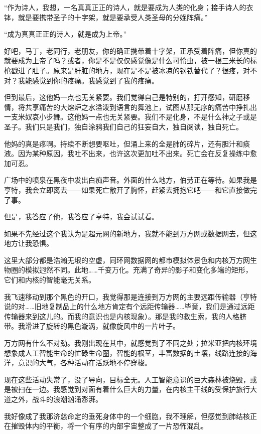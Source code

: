 \documentclass[AutoFakeBold=true]{book}
\begin{document}
``作为诗人，我想，一名真真正正的诗人，就是要成为人类的化身；接手诗人的衣钵，就是要携带圣子的十字架，就是要承受人类圣母的分娩阵痛。''

``成为真真正正的诗人，就是成为上帝。''

好吧，马丁，老同行，老朋友，你的确正携带着十字架，正承受着阵痛，但你真的就要成为上帝了吗？或者，你是不是仅仅感觉像是什么可怜虫，被一根三米长的标枪戳进了肚子。原来是肝脏的地方，现在是不是被冰凉的钢铁替代了？很疼，对不对？我能感觉到你的疼痛。我感觉到了我的疼痛。

但到最后，这他妈一点也无关紧要。我们觉得自己是特别的，打开感知，研磨移情，将共享痛苦的大熔炉之水溢泼到语言的舞池上，试图从那无序的痛苦中挣扎出一支米奴哀小步舞。这他妈一点也无关紧要。我们不是化身，不是什么神之子或是圣子。我们只是我们，独自涂鸦我们自己的狂妄自大，独自阅读，独自死亡。

他妈的真是疼啊。持续不断想要呕吐，但涌上来的全是肺的碎片，还有胆汁和痰液。因为某种原因，我吐不出来，也许这次更加吐不出来。死亡会在反复操练中愈加可忍。

广场中的喷泉在黑夜中发出白痴声音。外面的什么地方，伯劳正在等待。如果我是亨特，我会立即离去——如果死亡敞开了胸怀，赶紧去拥抱它吧——和它直接做完了事。

但是，我答应了他，我答应了亨特，我会试试看。

\vspace*{1em}

如果不先经过这个我认为是超元网的新地方，我就不能到万方网或数据网去，但这地方让我恐惧。

这里大部分都是浩瀚无垠的空虚，同环网数据网的都市模拟体景色和内核万方网生物圈的模拟迥然不同。此地……千变万化。充满了奇异的影子和变化多端的矩形，它们和内核的智能毫无关系。

我飞速移动到那个黑色的开口，我觉得那是连接到万方网的主要远距传输器（亨特说的对……旧地复制品上的什么地方肯定有个远距传输器……毕竟，我们是通过远距传输器来到这儿的。而我的意识也是内核现象）。那是我的救生索，我的人格脐带。我滑进了旋转的黑色漩涡，就像旋风中的一片叶子。

万方网有什么不对劲。我刚出现在其中，就感觉到了不同之处；拉米亚把内核环境想象成人工智能生命的忙碌生命圈，智能的根茎，丰富数据的土壤，线路连接的海洋，意识的大气，各种活动在活跃地不停穿梭。

现在这些活动失常了，没了导向，目标全无。人工智能意识的巨大森林被烧毁，或是被扫在一边。我感觉到对面有着什么巨大的力量，在内核主干线的受保护旅行大道之外，战斗的浪潮汹涌澎湃。

我好像成了我那济慈命定的垂死身体中的一个细胞，我不理解，但感觉到肺结核正在摧毁体内的平衡，将一个有序的内部宇宙整成了一片恐怖混乱。
\end{document}
